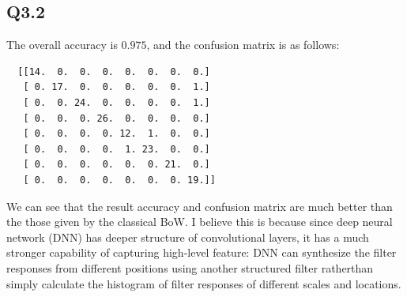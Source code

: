\documentclass[11pt]{article}
\begin{document}
\newpage

\subsection*{Q3.2}

The overall accuracy is $0.975$, and the confusion matrix is as follows:

\begin{verbatim}
  [[14.  0.  0.  0.  0.  0.  0.  0.]
   [ 0. 17.  0.  0.  0.  0.  0.  1.]
   [ 0.  0. 24.  0.  0.  0.  0.  1.]
   [ 0.  0.  0. 26.  0.  0.  0.  0.]
   [ 0.  0.  0.  0. 12.  1.  0.  0.]
   [ 0.  0.  0.  0.  1. 23.  0.  0.]
   [ 0.  0.  0.  0.  0.  0. 21.  0.]
   [ 0.  0.  0.  0.  0.  0.  0. 19.]]
\end{verbatim}

We can see that the result accuracy and confusion matrix are much better than the those given by the classical BoW. I believe this is because since deep neural network (DNN) has deeper structure of convolutional layers, it has a much stronger capability of capturing high-level feature: DNN can synthesize the filter responses from different positions using another structured filter ratherthan simply calculate the histogram of filter responses of different scales and locations.
\end{document}
